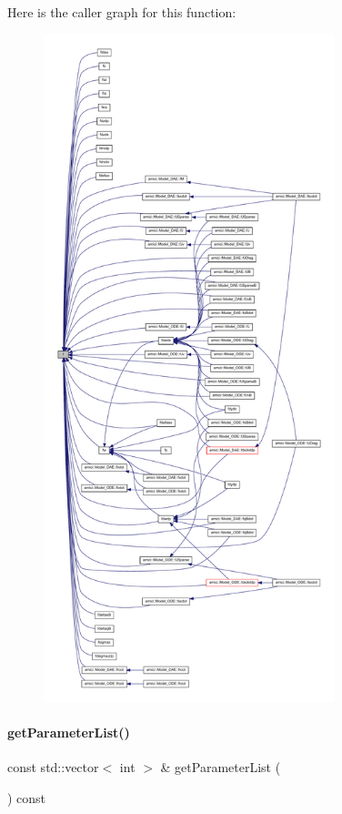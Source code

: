 Here is the caller graph for this function\+:
\nopagebreak
\begin{figure}[H]
\begin{center}
\leavevmode
\includegraphics[height=550pt]{classamici_1_1_model_a711281d57e9710226face29151cc4641_icgraph}
\end{center}
\end{figure}
\mbox{\label{classamici_1_1_model_a94b6dfdb4883c916627b287e4d7b9b44}} 
\paragraph{\texorpdfstring{get\+Parameter\+List()}{getParameterList()}}
{\footnotesize\ttfamily const std\+::vector$<$ int $>$ \& get\+Parameter\+List (\begin{DoxyParamCaption}{ }\end{DoxyParamCaption}) const}


